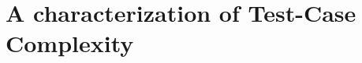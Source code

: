 \chapter[~~~~~~~~~~~~Characterizing Test-case Complexity]{A characterization of Test-Case Complexity}\label{ch:complexity}








